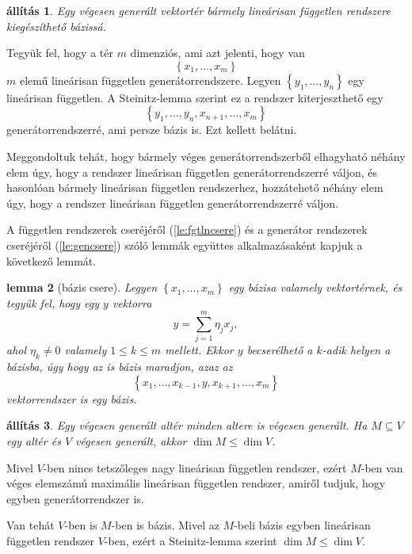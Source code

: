 \documentclass[9pt, showtrims]{memoir}
\makeatletter
\renewenvironment{proof}[1][\proofname]
    {\par\pushQED{\qed}%
    \normalfont \topsep6\p@\@plus6\p@\relax
    \trivlist
    \item[\hskip\labelsep
        \itshape
    #1\@addpunct{:}]\ignorespaces}
    {\popQED\endtrivlist\@endpefalse}
\theoremstyle{plain}
\newtheorem{proposition}{állítás}[section]
\newtheorem{lemma}[proposition]{lemma}
\theoremstyle{remark}
\theoremstyle{definition}
\makeatother
\begin{document}
\begin{proposition}
    Egy végesen generált vektortér bármely lineárisan független rendszere kiegészíthető bázissá.
    \label{pr:lfgtenbazissa}
\end{proposition}
\begin{proof}
    Tegyük fel, hogy a tér $m$ dimenziós, ami azt jelenti, hogy van 
    \[
        \left\{ x_1,\dots,x_m \right\}
    \]
    $m$ elemű lineárisan független generátorrendszere.
    Legyen $\left\{ y_1,\dots,y_n \right\}$ egy lineárisan független.
    A Steinitz-lemma szerint ez a rendszer kiterjeszthető egy 
    \[
        \left\{ y_1,\dots,y_n,x_{n+1},\dots,x_m \right\}
    \]
    generátorrendszerré, ami persze bázis is.
    Ezt kellett belátni. 
\end{proof}

Meggondoltuk tehát, hogy bármely véges generátorrendszerből elhagyható néhány elem úgy, 
hogy a rendszer lineárisan független generátorrendszerré váljon,
és hasonlóan bármely lineárisan független rendszerhez, hozzátehető néhány elem úgy, hogy a
rendszer lineárisan független generátorrendszerré váljon.

A független rendszerek cseréjéről (\ref{le:fgtlncsere}) és a generátor rendszerek cseréjéről (\ref{le:gencsere}) szóló lemmák 
együttes alkalmazásaként kapjuk a következő lemmát.

\begin{lemma}[bázis csere]\label{le:baziscsere}
    Legyen $\left\{ x_1,\dots,x_m \right\}$ egy bázisa valamely vektortérnek,
    és tegyük fel, 
    hogy egy $y$ vektorra
    \[
        y=\sum_{j=1}^m\eta_jx_j,
    \]
    ahol $\eta_k\neq 0$ valamely $1\leq k\leq m$ mellett. 
    Ekkor $y$ becserélhető a $k$-adik helyen a bázisba, 
    úgy hogy az is bázis maradjon, azaz az
    \[
        \left\{ x_1,\dots,x_{k-1},y,x_{k+1},\dots,x_m \right\}
    \]
    vektorrendszer is egy bázis.
\end{lemma}

\begin{proposition}
    Egy végesen generált altér minden altere is végesen generált.
    Ha $M\subseteq V$ egy altér és $V$ végesen generált,
    akkor $\dim M\leq \dim V$.
\end{proposition}
\begin{proof}
    Mivel $V$-ben nincs tetszőleges nagy lineárisan független rendszer,
    ezért $M$-ben van véges elemszámú maximális lineárisan független rendszer,
    amiről tudjuk, hogy egyben generátorrendszer is.

    Van tehát $V$-ben is $M$-ben is bázis.
    Mivel az $M$-beli bázis egyben lineárisan független rendszer $V$-ben,
    ezért a Steinitz-lemma szerint $\dim M\leq\dim V$.
\end{proof}
\end{document}
